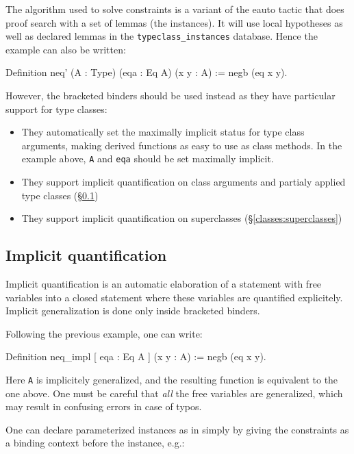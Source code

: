 The algorithm used to solve constraints is a variant of the eauto tactic
that does proof search with a set of lemmas (the instances). It will use
local hypotheses as well as declared lemmas in the
\texttt{typeclass\_instances} database. Hence the example can also be
written:

\begin{coq_example}
  Definition neq' (A : Type) (eqa : Eq A) (x y : A) := negb (eq x y).
\end{coq_example}

However, the bracketed binders should be used instead as they have
particular support for type classes:
\begin{itemize}
\item They automatically set the maximally implicit status for type
  class arguments, making derived functions as easy to use as class
  methods. In the example above, \texttt{A} and \texttt{eqa} should be
  set maximally implicit.
\item They support implicit quantification on class arguments and
  partialy applied type classes (\S \ref{classes:impl-quant})
\item They support implicit quantification on superclasses (\S \ref{classes:superclasses})
\end{itemize}

\subsection{Implicit quantification}
\label{classes:impl-quant}

Implicit quantification is an automatic elaboration of a statement with
free variables into a closed statement where these variables are
quantified explicitely. Implicit generalization is done only inside
bracketed binders.

Following the previous example, one can write:
\begin{coq_example}
  Definition neq_impl [ eqa : Eq A ] (x y : A) := negb (eq x y).
\end{coq_example}

Here \texttt{A} is implicitely generalized, and the resulting function
is equivalent to the one above. One must be careful that \emph{all} the
free variables are generalized, which may result in confusing errors in
case of typos. 


One can declare parameterized instances as in \Haskell simply by giving
the constraints as a binding context before the instance, e.g.:

